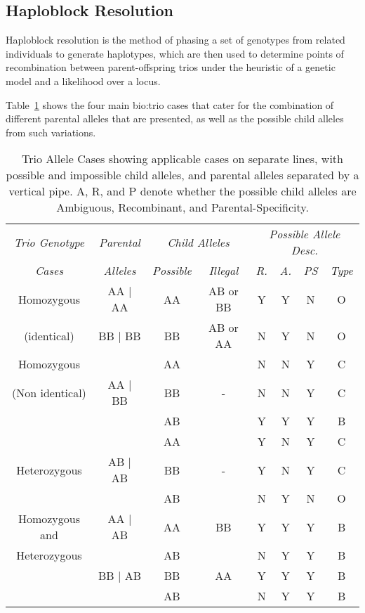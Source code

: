 \subsection{Haploblock Resolution}

Haploblock resolution is the method of phasing a set of genotypes from related individuals to generate haplotypes, which are then used to determine points of recombination between parent-offspring trios under the heuristic of a genetic model and a likelihood over a locus.

Table~\ref{table:haplo:trioalleles} shows the four main \gls{bio:trio} cases that cater for the combination of different parental alleles that are presented, as well as the possible child alleles from such variations.


\begin{table}[h]
\begin{center}
\begin{tabular}{ *8c } \toprule
\emph{Trio Genotype} & \emph{Parental} & \multicolumn{2}{c}{\emph{Child Alleles}} & \multicolumn{4}{c}{\emph{Possible Allele Desc.}} \\
\emph{Cases} & \emph{Alleles} & \emph{Possible} & \emph{Illegal} & \emph{R.} & \emph{A.} & \emph{PS} & \emph{Type} \\
\midrule
Homozygous  & AA | AA & AA & AB or BB & Y & Y & N & O \\
(identical) & BB | BB & BB & AB or AA & N & Y & N & O \\
\hline
Homozygous      &         & AA &    & N & N & Y & C\\
(Non identical) & AA | BB & BB & -  & N & N & Y & C\\
                &         & AB &    & Y & Y & Y & B\\
\hline
                &         & AA &    & Y & N & Y & C\\
Heterozygous    & AB | AB & BB & -  & Y & N & Y & C\\
                &         & AB &    & N & Y & N & O\\
\hline
Homozygous and  & AA | AB & AA & BB & Y & Y & Y & B\\
Heterozygous    &         & AB &    & N & Y & Y & B\\
                & BB | AB & BB & AA & Y & Y & Y & B\\
                &         & AB &    & N & Y & Y & B\\
\hline
\end{tabular}
\end{center}
\caption[Trio Allele Cases]{Trio Allele Cases showing applicable cases on separate lines, with possible and impossible child alleles, and parental alleles separated by a vertical pipe. A, R, and P denote whether the possible child alleles are Ambiguous, Recombinant, and Parental-Specificity.}\label{table:haplo:trioalleles}
\end{table}

